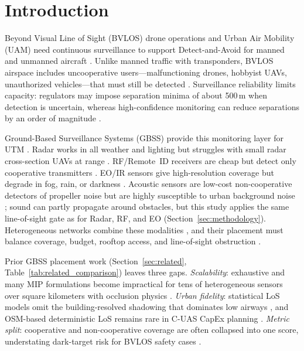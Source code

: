 \section{Introduction}

Beyond Visual Line of Sight (BVLOS) drone operations and Urban Air Mobility (UAM) need continuous surveillance to support Detect-and-Avoid for manned and unmanned aircraft \cite{faa2023uam,mueller2017enabling}. Unlike manned traffic with transponders, BVLOS airspace includes uncooperative users---malfunctioning drones, hobbyist UAVs, unauthorized vehicles---that must still be detected \cite{faa2020utm}. Surveillance reliability limits capacity: regulators may impose separation minima of about 500\,m when detection is uncertain, whereas high-confidence monitoring can reduce separations by an order of magnitude \cite{nasa2021utm}.

Ground-Based Surveillance Systems (GBSS) provide this monitoring layer for UTM \cite{kopardekar2016unmanned}. Radar works in all weather and lighting but struggles with small radar cross-section UAVs at range \cite{guvenc2018detection,semkin2020analyzing}. RF/Remote~ID receivers are cheap but detect only cooperative transmitters \cite{guvenc2018detection,besada2022cuas}. EO/IR sensors give high-resolution coverage but degrade in fog, rain, or darkness \cite{guvenc2018detection,yan2023passive}. Acoustic sensors are low-cost non-cooperative detectors of propeller noise but are highly susceptible to urban background noise \cite{guvenc2018detection,yan2023passive}; sound can partly propagate around obstacles, but this study applies the same line-of-sight gate as for Radar, RF, and EO (Section~\ref{sec:methodology}). Heterogeneous networks combine these modalities \cite{muscat2023,besada2022cuas,blasch2021information}, and their placement must balance coverage, budget, rooftop access, and line-of-sight obstruction \cite{aievola2022ground,dulia2024sand}.

Prior GBSS placement work (Section~\ref{sec:related}, Table~\ref{tab:related_comparison}) leaves three gaps. \emph{Scalability}: exhaustive and many MIP formulations become impractical for tens of heterogeneous sensors over square kilometers with occlusion physics \cite{muscat2023,katoh1998resource}. \emph{Urban fidelity}: statistical LoS models omit the building-resolved shadowing that dominates low airways \cite{3gpp38901,itur_p1411}, and OSM-based deterministic LoS remains rare in C-UAS CapEx planning \cite{osm_applications}. \emph{Metric split}: cooperative and non-cooperative coverage are often collapsed into one score, understating dark-target risk for BVLOS safety cases \cite{besada2022cuas,blasch2021information}.

